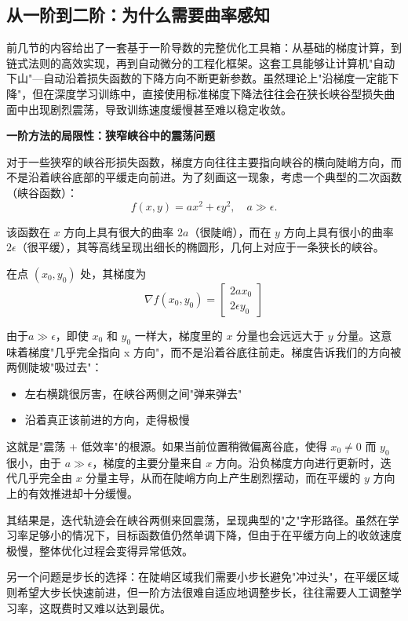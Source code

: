 \subsection{从一阶到二阶：为什么需要曲率感知}

前几节的内容给出了一套基于一阶导数的完整优化工具箱：从基础的梯度计算，到链式法则的高效实现，再到自动微分的工程化框架。这套工具能够让计算机"自动下山"---自动沿着损失函数的下降方向不断更新参数。虽然理论上"沿梯度一定能下降"，但在深度学习训练中，直接使用标准梯度下降法往往会在狭长峡谷型损失曲面中出现剧烈震荡，导致训练速度缓慢甚至难以稳定收敛。

\textbf{一阶方法的局限性：狭窄峡谷中的震荡问题}

对于一些狭窄的峡谷形损失函数，梯度方向往往主要指向峡谷的横向陡峭方向，而不是沿着峡谷底部的平缓走向前进。为了刻画这一现象，考虑一个典型的二次函数（峡谷函数）：
\[
f(x,y) = a x^2 + \epsilon y^2,\quad a \gg \epsilon.
\]

该函数在 $x$ 方向上具有很大的曲率 $2a$（很陡峭），而在 $y$ 方向上具有很小的曲率 $2\epsilon$（很平缓），其等高线呈现出细长的椭圆形，几何上对应于一条狭长的峡谷。

在点 $(x_0, y_0)$ 处，其梯度为
$$\nabla f(x_0, y_0) = \begin{bmatrix} 2ax_0 \\ 2\epsilon y_0 \end{bmatrix}$$

由于$a \gg \epsilon$，即使 $x_0$ 和 $y_0$ 一样大，梯度里的 $x$ 分量也会远远大于 $y$ 分量。这意味着梯度"几乎完全指向 x 方向"，而不是沿着谷底往前走。梯度告诉我们的方向被两侧陡坡"吸过去"：

\begin{itemize}
    \item 左右横跳很厉害，在峡谷两侧之间"弹来弹去"
    \item 沿着真正该前进的方向，走得极慢
\end{itemize}

这就是"震荡 + 低效率"的根源。如果当前位置稍微偏离谷底，使得 $x_0 \neq 0$ 而 $y_0$ 很小，由于 $a \gg \epsilon$，梯度的主要分量来自 $x$ 方向。沿负梯度方向进行更新时，迭代几乎完全由 $x$ 分量主导，从而在陡峭方向上产生剧烈摆动，而在平缓的 $y$ 方向上的有效推进却十分缓慢。

其结果是，迭代轨迹会在峡谷两侧来回震荡，呈现典型的"之"字形路径。虽然在学习率足够小的情况下，目标函数值仍然单调下降，但由于在平缓方向上的收敛速度极慢，整体优化过程会变得异常低效。

另一个问题是步长的选择：在陡峭区域我们需要小步长避免"冲过头"，在平缓区域则希望大步长快速前进，但一阶方法很难自适应地调整步长，往往需要人工调整学习率，这既费时又难以达到最优。

